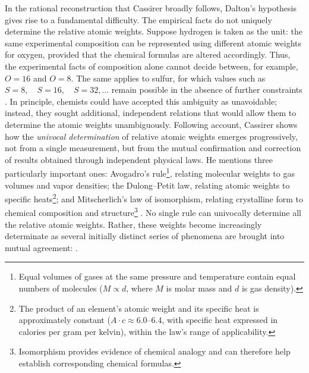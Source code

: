 \documentclass[submitted,12pt]{article}
\renewcommand{\SF}[2]{\citep[#1/#2]{Cassirer1910}}
\begin{document}
In the rational reconstruction that Cassirer broadly follows, Dalton's hypothesis gives rise to a fundamental difficulty. The empirical facts do not uniquely determine the relative atomic weights. Suppose hydrogen is taken as the unit: the same experimental composition can be represented using different atomic weights for oxygen, provided that the chemical formulas are altered accordingly. Thus, the experimental facts of composition alone cannot decide between, for example, $O=16$ and $O=8$. The same applies to sulfur, for which values such as $S=8, \quad S=16, \quad S=32, \ldots$ remain possible in the absence of further constraints \SF{274--75}{206--7}. In principle, chemists could have accepted this ambiguity as unavoidable; instead, they sought additional, independent relations that would allow them to determine the atomic weights unambiguously. Following  account, Cassirer shows how the \emph{univocal determination} of relative atomic weights emerges progressively, not from a single measurement, but from the mutual confirmation and correction of results obtained through independent physical laws. He mentions three particularly important ones: Avogadro's rule\footnote{Equal volumes of gases at the same pressure and temperature contain equal numbers of molecules ($M \propto d$, where $M$ is molar mass and $d$ is gas density).}, relating molecular weights to gas volumes and vapor densities; the Dulong--Petit law, relating atomic weights to specific heats\footnote{The product of an element's atomic weight and its specific heat is approximately constant ($A \cdot c \approx 6.0\text{–}6.4$, with specific heat expressed in calories per gram per kelvin), within the law's range of applicability.}; and Mitscherlich's law of isomorphism, relating crystalline form to chemical composition and structure\footnote{Isomorphism provides evidence of chemical analogy and can therefore help establish corresponding chemical formulas.} \SF{275}{207}. No single rule can univocally determine all the relative atomic weights. Rather, these weights become increasingly determinate as several initially distinct series of phenomena are brought into mutual agreement:  \SF{275}{207}.
\end{document}
